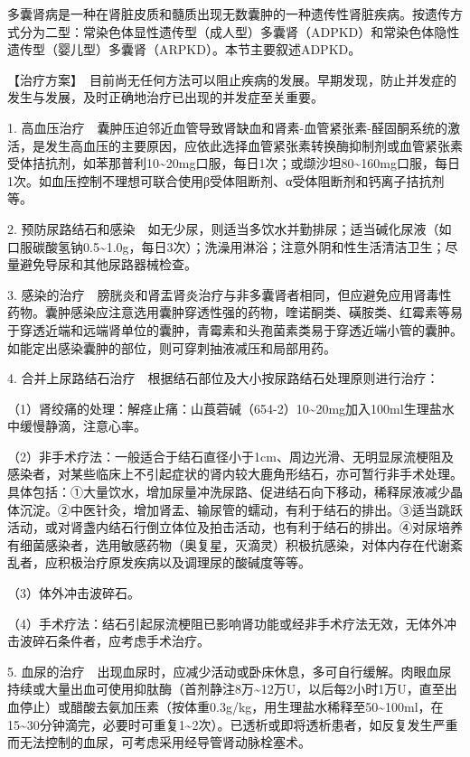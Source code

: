 多囊肾病是一种在肾脏皮质和髓质出现无数囊肿的一种遗传性肾脏疾病。按遗传方式分为二型：常染色体显性遗传型（成人型）多囊肾（ADPKD）和常染色体隐性遗传型（婴儿型）多囊肾（ARPKD）。本节主要叙述ADPKD。

【治疗方案】　目前尚无任何方法可以阻止疾病的发展。早期发现，防止并发症的发生与发展，及时正确地治疗已出现的并发症至关重要。

1.
高血压治疗　囊肿压迫邻近血管导致肾缺血和肾素-血管紧张素-醛固酮系统的激活，是发生高血压的主要原因，应依此选择血管紧张素转换酶抑制剂或血管紧张素受体拮抗剂，如苯那普利10\textasciitilde{}20mg口服，每日1次；或缬沙坦80\textasciitilde{}160mg口服，每日1次。如血压控制不理想可联合使用β受体阻断剂、α受体阻断剂和钙离子拮抗剂等。

2.
预防尿路结石和感染　如无少尿，则适当多饮水并勤排尿；适当碱化尿液（如口服碳酸氢钠0.5\textasciitilde{}1.0g，每日3次）；洗澡用淋浴；注意外阴和性生活清洁卫生；尽量避免导尿和其他尿路器械检查。

3.
感染的治疗　膀胱炎和肾盂肾炎治疗与非多囊肾者相同，但应避免应用肾毒性药物。囊肿感染应注意选用囊肿穿透性强的药物，喹诺酮类、磺胺类、红霉素等易于穿透近端和远端肾单位的囊肿，青霉素和头孢菌素类易于穿透近端小管的囊肿。如能定出感染囊肿的部位，则可穿刺抽液减压和局部用药。

4. 合并上尿路结石治疗　根据结石部位及大小按尿路结石处理原则进行治疗：

（1）肾绞痛的处理：解痉止痛：山莨菪碱（654-2）10\textasciitilde{}20mg加入100ml生理盐水中缓慢静滴，注意心率。

（2）非手术疗法：一般适合于结石直径小于1cm、周边光滑、无明显尿流梗阻及感染者，对某些临床上不引起症状的肾内较大鹿角形结石，亦可暂行非手术处理。具体包括：①大量饮水，增加尿量冲洗尿路、促进结石向下移动，稀释尿液减少晶体沉淀。②中医针灸，增加肾盂、输尿管的蠕动，有利于结石的排出。③适当跳跃活动，或对肾盏内结石行倒立体位及拍击活动，也有利于结石的排出。④对尿培养有细菌感染者，选用敏感药物（奥复星，灭滴灵）积极抗感染，对体内存在代谢紊乱者，应积极治疗原发疾病以及调理尿的酸碱度等等。

（3）体外冲击波碎石。

（4）手术疗法：结石引起尿流梗阻已影响肾功能或经非手术疗法无效，无体外冲击波碎石条件者，应考虑手术治疗。

5.
血尿的治疗　出现血尿时，应减少活动或卧床休息，多可自行缓解。肉眼血尿持续或大量出血可使用抑肽酶（首剂静注8万\textasciitilde{}12万U，以后每2小时1万U，直至出血停止）或醋酸去氨加压素（按体重0.3g/kg，用生理盐水稀释至50\textasciitilde{}100ml，在15\textasciitilde{}30分钟滴完，必要时可重复1\textasciitilde{}2次）。已透析或即将透析患者，如反复发生严重而无法控制的血尿，可考虑采用经导管肾动脉栓塞术。

